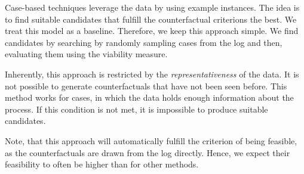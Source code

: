 \documentclass[./../../paper.tex]{subfiles}
\begin{document}
Case-based techniques leverage the data by using example instances. The idea is to find suitable candidates that fulfill the counterfactual criterions the best. We treat this model as a baseline. Therefore, we keep this approach simple. We find candidates by searching by randomly sampling cases from the log and then, evaluating them using the viability measure.

Inherently, this approach is restricted by the \emph{representativeness} of the data. It is not possible to generate counterfactuals that have not been seen before. This method works for cases, in which the data holds enough information about the process. If this condition is not met, it is impossible to produce suitable candidates.

Note, that this approach will automatically fulfill the criterion of being feasible, as the counterfactuals are drawn from the log directly. Hence, we expect their feasibility to often be higher than for other methods.
\end{document}
